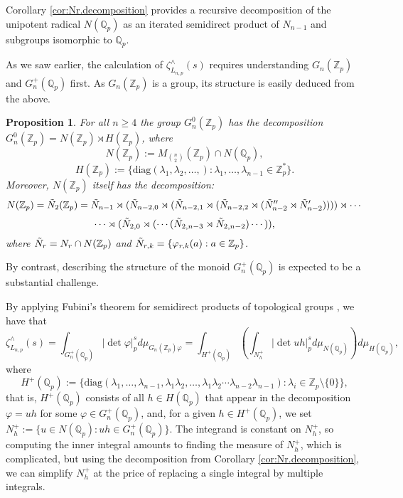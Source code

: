 \documentclass{article}
\newtheorem{proposition2}[theorem2]{Proposition}
\begin{document}
Corollary \ref{cor:Nr.decomposition} provides a recursive decomposition of the unipotent radical $N(\mathbb{Q}_{p})$ as an iterated semidirect product of $N_{n-1}$ and subgroups isomorphic to $\mathbb{Q}_{p}$.

As we saw earlier, the calculation of $\zeta_{L_{n,p}}^{\wedge}(s)$ requires understanding $G_{n}(\mathbb{Z}_p)$ and $G_{n}^{+}(\mathbb{Q}_p)$ first. As $G_{n}(\mathbb{Z}_{p})$ is a group, its structure is easily deduced from the above.
\begin{proposition2}
\label{prop:G.n.Zp.decomposition}
For all $n\geq{4}$ the group $G_{n}^{0}(\mathbb{Z}_{p})$ has the decomposition $G_{n}^{0}(\mathbb{Z}_{p})=N(\mathbb{Z}_{p})\rtimes{H(\mathbb{Z}_{p})}$, where \[N(\mathbb{Z}_{p}):=M_{\binom{n}{2}}(\mathbb{Z}_{p})\cap{N(\mathbb{Q}_{p})},\]
\[H(\mathbb{Z}_{p}):=\{\mathrm{diag}(\lambda_{1},\lambda_{2},\dots,) : \lambda_1,\dots,\lambda_{n-1}\in\mathbb{Z}_{p}^{\ast}\}.\]
Moreover, $N(\mathbb{Z}_{p})$ itself has the decomposition: \[N(\mathbb{Z}_{p})=\Tilde{N}_{2}(\mathbb{Z}_{p})=
\Tilde{N}_{n-1}\rtimes({\Tilde{N}_{n-2,0}}\rtimes(\Tilde{N}_{n-2,1}\rtimes(\Tilde{N}_{n-2,2}\rtimes(\Tilde{N}''_{n-2}\rtimes{\Tilde{N}'_{n-2}}))))\rtimes\cdots\]\[\cdots\rtimes{(\Tilde{N}_{2,0}\rtimes(\cdots(\Tilde{N}_{2,n-3}\rtimes{\Tilde{N}_{2,n-2}})\cdots))}
,\]
where $\Tilde{N}_{r}=N_{r}\cap{N(\mathbb{Z}_{p})}$ and $\Tilde{N}_{r,k}=\{\varphi_{r,k}(a) : a\in\mathbb{Z}_{p}\}$.
\end{proposition2}
By contrast, describing the structure of the monoid $G_{n}^{+}(\mathbb{Q}_p)$ is expected to be a substantial challenge.

By applying Fubini's theorem for semidirect products of topological groups \cite[Proposition 28]{Nachbin}, we have that \[\zeta_{L_{n,p}}^{\wedge}(s)=\displaystyle\int_{G_{n}^{+}(\mathbb{Q}_p)}|\det{\varphi}|_p^sd\mu_{G_{n}(\mathbb{Z}_p)\varphi}=\displaystyle\int_{H^+(\mathbb{Q}_p)}\left(\displaystyle\int_{N_{h}^+}|\det{uh}|_p^sd\mu_{N(\mathbb{Q}_p)}\right)d\mu_{H(\mathbb{Q}_p)},\]
where \[H^+(\mathbb{Q}_p):=\{\mathrm{diag}(\lambda_{1},\dots,\lambda_{n-1},\lambda_{1}\lambda_{2},\dots,\lambda_{1}\lambda_{2}\cdots\lambda_{n-2}\lambda_{n-1}) : \lambda_{i}\in\mathbb{Z}_{p}\setminus\{0\}\},\]
that is, $H^+(\mathbb{Q}_p)$ consists of all $h\in{H(\mathbb{Q}_{p})}$ that appear in the decomposition $\varphi=uh$ for some $\varphi\in{G_{n}^{+}(\mathbb{Q}_{p})}$, and, for a given $h\in{H^{+}(\mathbb{Q}_{p})}$, we set $N_{h}^{+}:=\{u\in{N(\mathbb{Q}_{p}) : uh\in{G_{n}^{+}(\mathbb{Q}_{p})}}\}$. The integrand is constant on $N_{h}^{+}$, so computing the inner integral amounts to finding the measure of $N_{h}^+$, which is complicated, but using the decomposition from Corollary \ref{cor:Nr.decomposition}, we can simplify $N_{h}^{+}$ at the price of replacing a single integral by multiple integrals.
\end{document}
